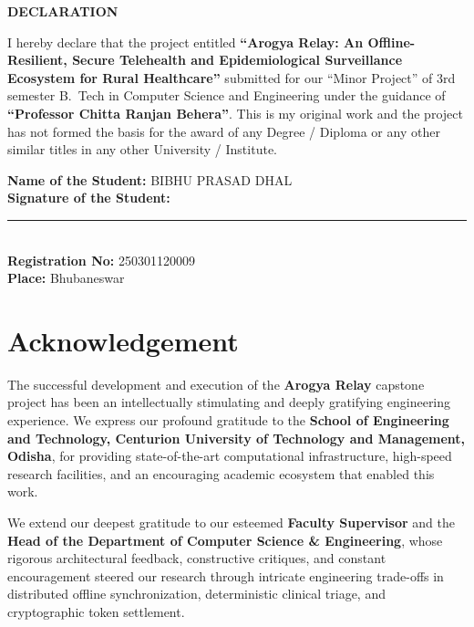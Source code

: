 \documentclass[12pt,a4paper,oneside]{report}
\begin{document}
\clearpage

\thispagestyle{plain}

\begin{center}
    {\fontsize{16}{20}\selectfont \bfseries DECLARATION}
\end{center}
\vspace{1.0cm}

{\fontsize{13}{20}\selectfont
\noindent I hereby declare that the project entitled \textbf{``Arogya Relay: An Offline-Resilient, Secure Telehealth and Epidemiological Surveillance Ecosystem for Rural Healthcare''} submitted for our ``Minor Project'' of 3rd semester B.~Tech in Computer Science and Engineering under the guidance of \textbf{``Professor Chitta Ranjan Behera''}. This is my original work and the project has not formed the basis for the award of any Degree / Diploma or any other similar titles in any other University / Institute.
}

\vspace{3.5cm}

\noindent
{\fontsize{13}{22}\selectfont
\textbf{Name of the Student:} BIBHU PRASAD DHAL \\[0.4cm]
\textbf{Signature of the Student:} \rule{5.5cm}{0.4pt} \\[0.4cm]
\textbf{Registration No:} 250301120009 \\[0.4cm]
\textbf{Place:} Bhubaneswar
}

\clearpage
\chapter*{Acknowledgement}

The successful development and execution of the \textbf{Arogya Relay} capstone project has been an intellectually stimulating and deeply gratifying engineering experience. We express our profound gratitude to the \textbf{School of Engineering and Technology, Centurion University of Technology and Management, Odisha}, for providing state-of-the-art computational infrastructure, high-speed research facilities, and an encouraging academic ecosystem that enabled this work.

\vspace{0.4cm}
We extend our deepest gratitude to our esteemed \textbf{Faculty Supervisor} and the \textbf{Head of the Department of Computer Science \& Engineering}, whose rigorous architectural feedback, constructive critiques, and constant encouragement steered our research through intricate engineering trade-offs in distributed offline synchronization, deterministic clinical triage, and cryptographic token settlement.
\end{document}
